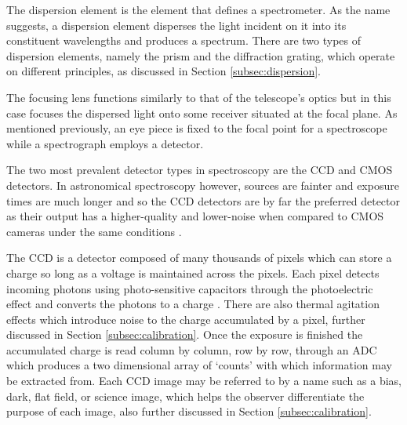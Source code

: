 

The dispersion element is the element that defines a spectrometer. As the name suggests, a dispersion element disperses the light incident on it into its constituent wavelengths and produces a spectrum. There are two types of dispersion elements, namely the prism and the diffraction grating, which operate on different principles, as discussed in Section \ref{subsec:dispersion}.
\prgph

The focusing lens functions similarly to that of the telescope's optics but in this case focuses the dispersed light onto some receiver situated at the focal plane. As mentioned previously, an eye piece is fixed to the focal point for a spectroscope while a spectrograph employs a detector.
\prgph

The two most prevalent detector types in spectroscopy are the \gls{CCD} and \gls{CMOS} detectors. In astronomical spectroscopy however, sources are fainter and exposure times are much longer and so the \gls{CCD} detectors are by far the preferred detector as their output has a higher-quality and lower-noise when compared to \gls{CMOS} cameras under the same conditions \citep{CCDvsCMOS}.
\prgph

The \gls{CCD} is a detector composed of many thousands of pixels which can store a charge so long as a voltage is maintained across the pixels. Each pixel detects incoming photons using photo-sensitive capacitors through the photoelectric effect and converts the photons to a charge \citep{CCDastronomy}. There are also thermal agitation effects which introduce noise to the charge accumulated by a pixel, further discussed in Section \ref{subsec:calibration}. Once the exposure is finished the accumulated charge is read column by column, row by row, through an \gls{ADC}  which produces a two dimensional array of `counts' with which information may be extracted from. Each \gls{CCD} image may be referred to by a name such as a bias, dark, flat field, or science image, which helps the observer differentiate the purpose of each image, also further discussed in Section \ref{subsec:calibration}.

